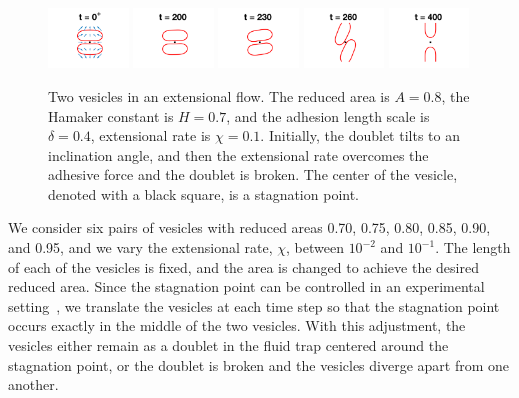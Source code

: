 \documentclass[prf,superscriptaddress,showpacs]{revtex4-1}
\begin{document}
\begin{figure}[htp]
  \includegraphics[width = 0.19\textwidth,trim={5cm 2cm 5cm 1cm},clip]{figs/extensional_adR4em1adS7em1Chi1em1_ra080_image01.png}
  \includegraphics[width = 0.19\textwidth,trim={5cm 2cm 5cm 1cm},clip]{figs/extensional_adR4em1adS7em1Chi1em1_ra080_image02.png}
  \includegraphics[width = 0.19\textwidth,trim={5cm 2cm 5cm 1cm},clip]{figs/extensional_adR4em1adS7em1Chi1em1_ra080_image03.png}
  \includegraphics[width = 0.19\textwidth,trim={5cm 2cm 5cm 1cm},clip]{figs/extensional_adR4em1adS7em1Chi1em1_ra080_image04.png}
  \includegraphics[width = 0.19\textwidth,trim={5cm 2cm 5cm 1cm},clip]{figs/extensional_adR4em1adS7em1Chi1em1_ra080_image05.png}
  \caption{\label{fig:extensional3} Two vesicles in an extensional flow.
  The reduced area is $A = 0.8$, the Hamaker constant is $H = 0.7$, and
  the adhesion length scale is $\delta = 0.4$, extensional rate is $\chi
  = 0.1$.  Initially, the doublet tilts to an inclination angle, and
  then the extensional rate overcomes the adhesive force and the doublet
  is broken.  The center of the vesicle, denoted with a black square, is
  a stagnation point.}
\end{figure}

We consider six pairs of vesicles with reduced areas 0.70, 0.75, 0.80,
0.85, 0.90, and 0.95, and we vary the extensional rate, $\chi$, between
$10^{-2}$ and $10^{-1}$.  The length of each of the vesicles is fixed,
and the area is changed to achieve the desired reduced area.  Since the
stagnation point can be controlled in an experimental
setting~\cite{Johnson-Chavarria2011_EMJ}, we translate the vesicles at
each time step so that the stagnation point occurs exactly in the middle
of the two vesicles.  With this adjustment, the vesicles either remain
as a doublet in the fluid trap centered around the stagnation point, or
the doublet is broken and the vesicles diverge apart from one another.
\end{document}
